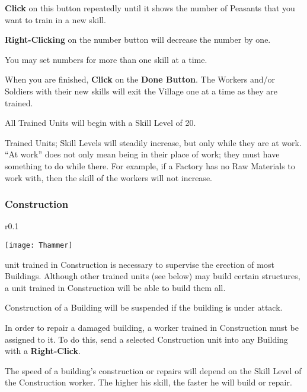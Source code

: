 \textbf{Click} on this button repeatedly until it shows the number of Peasants that you want to train in a new skill.

\textbf{Right-Clicking} on the number button will decrease the number by one.

You may set numbers for more than one skill at a time.

When you are finished, \textbf{Click} on the \textbf{Done Button}. The Workers and/or Soldiers with their new skills will exit the Village one at a time as they are trained.

All Trained Units will begin with a Skill Level of 20.

Trained Units; Skill Levels will steadily increase, but only while they are at work. “At work” does not only mean being in their place of work; they must have something to do while there. For example, if a Factory has no Raw Materials to work with, then the skill of the workers will not increase.

\subsubsection{\textsf{Construction}}


\begin{wrapfigure}{r}{0.1\textwidth}
    \vspace{-20pt}
    \begin{center}
        \texttt{[image: Thammer]}
    \end{center}
    \vspace{-20pt}
\end{wrapfigure}

 unit trained in Construction is necessary to supervise the erection of most Buildings. Although other trained units (see below) may build certain structures, a unit trained in Construction will be able to build them all.

Construction of a Building will be suspended if the building is under attack.

In order to repair a damaged building, a worker trained in Construction must be assigned to it. To do this, send a selected Construction unit into any Building with a \textbf{Right-Click}.

The speed of a building’s construction or repairs will depend on the Skill Level of the Construction worker. The higher his skill, the faster he will build or repair.

